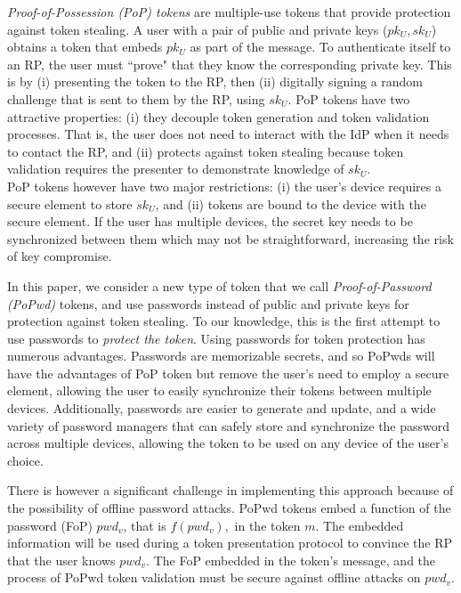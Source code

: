 \documentclass[conference]{IEEEtran}
\begin{document}
{\em Proof-of-Possession (PoP) tokens} \cite{rfc8705}  are multiple-use tokens that provide protection against token stealing. 
A user with a pair of public and private keys ($pk_{U},sk_{U}$) obtains a token that embeds $pk_{U}$ as part of the message. 
To authenticate itself to an RP, the user must ``prove" that they know the corresponding private key. %
This is by (i) presenting the token to the RP, then (ii) digitally signing a random challenge that is sent to them by the RP, using $sk_{U}$. PoP tokens have two attractive properties: (i) they decouple token generation and token validation processes.  That is, the user does not need to interact with the IdP when it needs to contact the RP, and (ii) protects against token stealing because token validation requires the presenter to demonstrate knowledge of $sk_{U}$.\\ 
PoP tokens however have two major restrictions: (i) the user's device requires a secure element to store $sk_{U}$, and (ii) tokens are bound to the device with the secure element. If the user has multiple devices, the secret key needs to be synchronized between them which may not be straightforward, %
increasing the risk of key compromise.

In this paper, we consider a new type of token that we call {\em Proof-of-Password (PoPwd) } tokens, and  use  passwords instead of public and  private keys for protection against token stealing. To our knowledge, this is the first attempt to use passwords to {\em protect the token}. Using passwords for token protection has numerous advantages. Passwords are memorizable secrets, and  so PoPwds will have the advantages of PoP token but  remove the user's need to employ a secure element, allowing the user to easily synchronize their tokens between multiple devices. Additionally, passwords are easier to generate and update, and a wide variety of password managers that can safely store and synchronize the password %
across multiple devices, allowing the token to be used on any device of the user's choice.

There is however a significant challenge in implementing this approach because of the possibility of offline password attacks. PoPwd tokens embed a function of the password (FoP) $pwd_v$, that is $f(pwd_{v}), $ in the token $m$. The embedded information will be used during a token presentation protocol %
to convince the RP that the user knows $pwd_{v}$. The FoP embedded in the token's message, and the process of PoPwd token validation must be secure against offline attacks on $pwd_{v}$.
\end{document}
